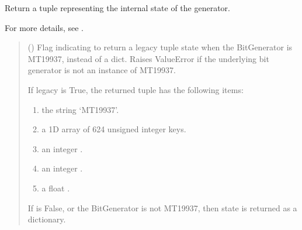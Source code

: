 \documentclass[letterpaper,10pt,english]{sphinxmanual}
\begin{document}

\begin{fulllineitems}
\label{\detokenize{metilda.controllers:metilda.controllers.pitch_art_wizard.get_state}}
\pysigstartsignatures
{}
\pysigstopsignatures
\sphinxAtStartPar
Return a tuple representing the internal state of the generator.

\sphinxAtStartPar
For more details, see .
\begin{quote}\begin{description}
\sphinxAtStartPar
{} (\sphinxstyleliteralemphasis{\sphinxupquote{, }}) \textendash{} Flag indicating to return a legacy tuple state when the BitGenerator
is MT19937, instead of a dict. Raises ValueError if the underlying
bit generator is not an instance of MT19937.

\sphinxAtStartPar

\sphinxAtStartPar
{} \textendash{} If legacy is True, the returned tuple has the following items:
\begin{enumerate}
%
\item {} 
\sphinxAtStartPar
the string ‘MT19937’.

\item {} 
\sphinxAtStartPar
a 1\sphinxhyphen{}D array of 624 unsigned integer keys.

\item {} 
\sphinxAtStartPar
an integer .

\item {} 
\sphinxAtStartPar
an integer .

\item {} 
\sphinxAtStartPar
a float .

\end{enumerate}

\sphinxAtStartPar
If  is False, or the BitGenerator is not MT19937, then
state is returned as a dictionary.



\end{description}
\end{quote}
\end{fulllineitems}
\end{document}
